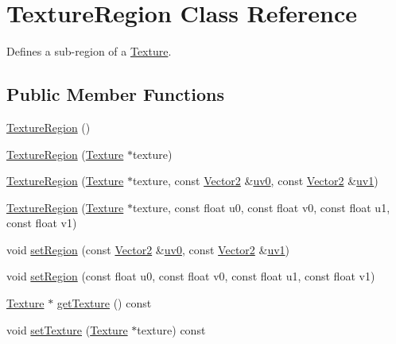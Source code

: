 \hypertarget{class_texture_region}{\section{Texture\+Region Class Reference}
\label{class_texture_region}
}


Defines a sub-\/region of a \hyperlink{class_texture}{Texture}.  


\subsection*{Public Member Functions}
\begin{DoxyCompactItemize}
\item 
\hyperlink{class_texture_region_a89bb8b66d1ae4c63e4382f97e5634c6a}{Texture\+Region} ()
\item 
\hyperlink{class_texture_region_a774026718faac265657f04b514304862}{Texture\+Region} (\hyperlink{class_texture}{Texture} $\ast$texture)
\item 
\hyperlink{class_texture_region_a022d7c52f955809eddbf142087390f41}{Texture\+Region} (\hyperlink{class_texture}{Texture} $\ast$texture, const \hyperlink{class_vector2}{Vector2} \&\hyperlink{class_texture_region_a5cc46b970a98f4914a1a02f5e8fc74a9}{uv0}, const \hyperlink{class_vector2}{Vector2} \&\hyperlink{class_texture_region_a33813851075ba1209a289d6b6be4004a}{uv1})
\item 
\hyperlink{class_texture_region_a6a88b03420dd5b746da29268a221e4e3}{Texture\+Region} (\hyperlink{class_texture}{Texture} $\ast$texture, const float u0, const float v0, const float u1, const float v1)
\item 
void \hyperlink{class_texture_region_ae1417fa3404f73f8b4a7dab621e543f3}{set\+Region} (const \hyperlink{class_vector2}{Vector2} \&\hyperlink{class_texture_region_a5cc46b970a98f4914a1a02f5e8fc74a9}{uv0}, const \hyperlink{class_vector2}{Vector2} \&\hyperlink{class_texture_region_a33813851075ba1209a289d6b6be4004a}{uv1})
\item 
void \hyperlink{class_texture_region_a22332d8004d920a33cc9ef04ee67ee1f}{set\+Region} (const float u0, const float v0, const float u1, const float v1)
\item 
\hyperlink{class_texture}{Texture} $\ast$ \hyperlink{class_texture_region_ae01540b88edcfdc565b5ec06709c6cdd}{get\+Texture} () const 
\item 
void \hyperlink{class_texture_region_a4402c0ee8816e60bc25d324a47c149f9}{set\+Texture} (\hyperlink{class_texture}{Texture} $\ast$texture) const 
\end{DoxyCompactItemize}

